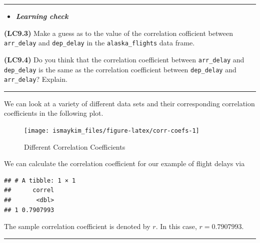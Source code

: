 \documentclass[]{tufte-book}
\newenvironment{Shaded}{\begin{snugshade}}{\end{snugshade}}
\newcommand{\KeywordTok}[1]{\textcolor[rgb]{0.13,0.29,0.53}{\textbf{{#1}}}}
\newcommand{\DataTypeTok}[1]{\textcolor[rgb]{0.13,0.29,0.53}{{#1}}}
\newcommand{\StringTok}[1]{\textcolor[rgb]{0.31,0.60,0.02}{{#1}}}
\newcommand{\NormalTok}[1]{{#1}}
\let\oldrule=\rule
\renewcommand{\rule}[1]{\oldrule{\linewidth}}
\newenvironment{rmdblock}[1]
  {\begin{shaded*}
  \begin{itemize}
  \renewcommand{\labelitemi}{
    \raisebox{-.7\height}[0pt][0pt]{
    }
  }
  \item
  }
  {
  \end{itemize}
  \end{shaded*}
  }
\newenvironment{learncheck}
  {\begin{rmdblock}{warning}}
  {\end{rmdblock}}
\begin{document}
\begin{center}\rule{0.5\linewidth}{\linethickness}\end{center}

\begin{learncheck}
\textbf{\emph{Learning check}}
\end{learncheck}

\textbf{(LC9.3)} Make a guess as to the value of the correlation
cofficient between \texttt{arr\_delay} and \texttt{dep\_delay} in the
\texttt{alaska\_flights} data frame.

\textbf{(LC9.4)} Do you think that the correlation coefficient between
\texttt{arr\_delay} and \texttt{dep\_delay} is the same as the
correlation coefficient between \texttt{dep\_delay} and
\texttt{arr\_delay}? Explain.

\begin{center}\rule{0.5\linewidth}{\linethickness}\end{center}

We can look at a variety of different data sets and their corresponding
correlation coefficients in the following plot.

\begin{figure}

{\centering \texttt{[image: ismaykim\_files/figure-latex/corr-coefs-1]} 

}

\caption[Different Correlation Coefficients]{Different Correlation Coefficients}\label{fig:corr-coefs}
\end{figure}

We can calculate the correlation coefficient for our example of flight
delays via

\begin{Shaded}
\end{Shaded}

\begin{verbatim}
## # A tibble: 1 × 1
##      correl
##       <dbl>
## 1 0.7907993
\end{verbatim}

The sample correlation coefficient is denoted by \(r\). In this case,
\(r = 0.7907993\).

\begin{center}\rule{0.5\linewidth}{\linethickness}\end{center}
\end{document}
